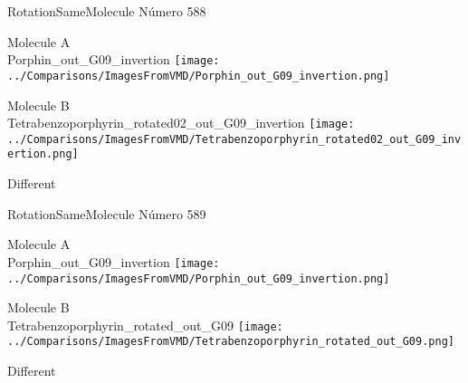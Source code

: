\vtab[-3cm]
\begin{center}
{\large RotationSameMolecule \tab Número 588}
\end{center}
\begin{multicols}{2}
\begin{center}
Molecule A \\ 
Porphin\_out\_G09\_invertion
\texttt{[image: ../Comparisons/ImagesFromVMD/Porphin\_out\_G09\_invertion.png]}
\\
\vtab

\columnbreak
Molecule B \\ 
Tetrabenzoporphyrin\_rotated02\_out\_G09\_invertion
\texttt{[image: ../Comparisons/ImagesFromVMD/Tetrabenzoporphyrin\_rotated02\_out\_G09\_invertion.png]}
\\
\vtab


\end{center}
\end{multicols}
\begin{center}
\textcolor{NavyBlue}{\Large Different}
\end{center}

 \newpage

\vtab[-3cm]
\begin{center}
{\large RotationSameMolecule \tab Número 589}
\end{center}
\begin{multicols}{2}
\begin{center}
Molecule A \\ 
Porphin\_out\_G09\_invertion
\texttt{[image: ../Comparisons/ImagesFromVMD/Porphin\_out\_G09\_invertion.png]}
\\
\vtab

\columnbreak
Molecule B \\ 
Tetrabenzoporphyrin\_rotated\_out\_G09
\texttt{[image: ../Comparisons/ImagesFromVMD/Tetrabenzoporphyrin\_rotated\_out\_G09.png]}
\\
\vtab


\end{center}
\end{multicols}
\begin{center}
\textcolor{NavyBlue}{\Large Different}
\end{center}

 \newpage

